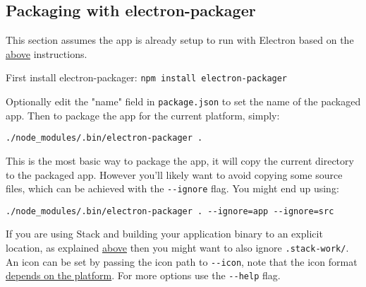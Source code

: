 \documentclass[11pt]{article}
\begin{document}
\subsection{Packaging with electron-packager}
\label{sec:orgfacb752}

This section assumes the app is already setup to run with Electron based on the
\hyperref[sec:org562eb1f]{above} instructions.

First install electron-packager: \texttt{npm install electron-packager}

Optionally edit the "name" field in \texttt{package.json} to set the name of the
packaged app. Then to package the app for the current platform, simply:

\begin{verbatim}
./node_modules/.bin/electron-packager .
\end{verbatim}

This is the most basic way to package the app, it will copy the current
directory to the packaged app. However you'll likely want to avoid copying some
source files, which can be achieved with the \texttt{-{}-ignore} flag. You might end up
using:

\begin{verbatim}
./node_modules/.bin/electron-packager . --ignore=app --ignore=src
\end{verbatim}

If you are using Stack and building your application binary to an explicit
location, as explained \hyperref[sec:orgcc92acc]{above} then you might want to also ignore \texttt{.stack-work/}.
An icon can be set by passing the icon path to \texttt{-{}-icon}, note that the icon
format \href{https://github.com/electron-userland/electron-packager/blob/master/docs/api.md\#icon}{depends on the platform}. For more options use the \texttt{-{}-help} flag.
\end{document}
